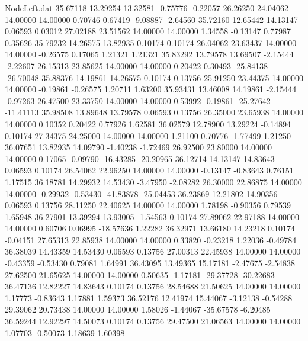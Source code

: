 \begin{filecontents}{NodeLeft.dat}
  35.67118   13.29254   13.32581    -0.75776   -0.22057   26.26250   24.04062   14.00000   14.00000    0.70746    0.67419   -9.08887   -2.64560
  35.72160   12.65442   14.13147     0.06593    0.03012   27.02188   23.51562   14.00000   14.00000    1.34558   -0.13147    0.77987    0.35626
  35.79232   14.26575   13.82935     0.10174    0.10174   26.04062   23.63437   14.00000   14.00000   -0.26575    0.17065    1.21321    1.21321
  35.83292   13.79578   13.69507    -2.15444   -2.22607   26.15313   23.85625   14.00000   14.00000    0.20422    0.30493  -25.84138  -26.70048
  35.88376   14.19861   14.26575     0.10174    0.13756   25.91250   23.44375   14.00000   14.00000   -0.19861   -0.26575    1.20711    1.63200
  35.93431   13.46008   14.19861    -2.15444   -0.97263   26.47500   23.33750   14.00000   14.00000    0.53992   -0.19861  -25.27642  -11.41113
  35.98508   13.89648   13.79578     0.06593    0.13756   26.35000   23.65938   14.00000   14.00000    0.10352    0.20422    0.77926    1.62581
  36.02579   12.78900   13.29224    -0.14894    0.10174   27.34375   24.25000   14.00000   14.00000    1.21100    0.70776   -1.77499    1.21250
  36.07651   13.82935   14.09790    -1.40238   -1.72469   26.92500   23.80000   14.00000   14.00000    0.17065   -0.09790  -16.43285  -20.20965
  36.12714   14.13147   14.83643     0.06593    0.10174   26.54062   22.96250   14.00000   14.00000   -0.13147   -0.83643    0.76151    1.17515
  36.18781   14.29932   14.53430    -3.47950   -2.08282   26.30000   22.86875   14.00000   14.00000   -0.29932   -0.53430  -41.83878  -25.04453
  36.23869   12.21802   14.90356     0.06593    0.13756   28.11250   22.40625   14.00000   14.00000    1.78198   -0.90356    0.79539    1.65948
  36.27901   13.39294   13.93005    -1.54563    0.10174   27.89062   22.97188   14.00000   14.00000    0.60706    0.06995  -18.57636    1.22282
  36.32971   13.66180   14.23218     0.10174   -0.04151   27.65313   22.85938   14.00000   14.00000    0.33820   -0.23218    1.22036   -0.49784
  36.38039   14.43359   14.53430     0.06593    0.13756   27.00313   22.45938   14.00000   14.00000   -0.43359   -0.53430    0.79081    1.64991
  36.43095   13.49365   15.17181    -2.47675   -2.54838   27.62500   21.65625   14.00000   14.00000    0.50635   -1.17181  -29.37728  -30.22683
  36.47136   12.82227   14.83643     0.10174    0.13756   28.54688   21.50625   14.00000   14.00000    1.17773   -0.83643    1.17881    1.59373
  36.52176   12.41974   15.44067    -3.12138   -0.54288   29.39062   20.73438   14.00000   14.00000    1.58026   -1.44067  -35.67578   -6.20485
  36.59244   12.92297   14.50073     0.10174    0.13756   29.47500   21.06563   14.00000   14.00000    1.07703   -0.50073    1.18639    1.60398

\end{filecontents}
